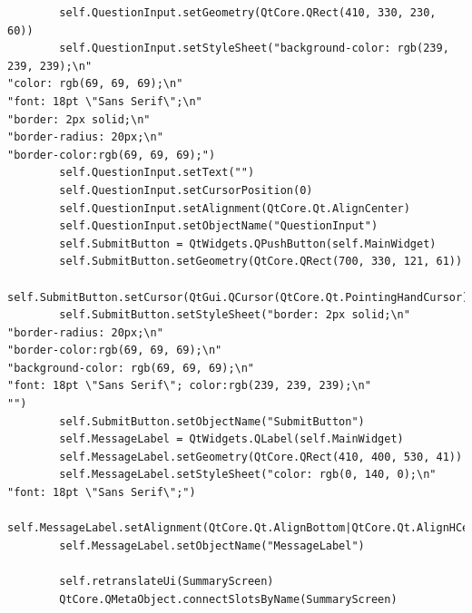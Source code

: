 \documentclass[12pt]{article}
\begin{document}
\begin{lstlisting}
        self.QuestionInput.setGeometry(QtCore.QRect(410, 330, 230, 60))
        self.QuestionInput.setStyleSheet("background-color: rgb(239, 239, 239);\n"
"color: rgb(69, 69, 69);\n"
"font: 18pt \"Sans Serif\";\n"
"border: 2px solid;\n"
"border-radius: 20px;\n"
"border-color:rgb(69, 69, 69);")
        self.QuestionInput.setText("")
        self.QuestionInput.setCursorPosition(0)
        self.QuestionInput.setAlignment(QtCore.Qt.AlignCenter)
        self.QuestionInput.setObjectName("QuestionInput")
        self.SubmitButton = QtWidgets.QPushButton(self.MainWidget)
        self.SubmitButton.setGeometry(QtCore.QRect(700, 330, 121, 61))
        self.SubmitButton.setCursor(QtGui.QCursor(QtCore.Qt.PointingHandCursor))
        self.SubmitButton.setStyleSheet("border: 2px solid;\n"
"border-radius: 20px;\n"
"border-color:rgb(69, 69, 69);\n"
"background-color: rgb(69, 69, 69);\n"
"font: 18pt \"Sans Serif\"; color:rgb(239, 239, 239);\n"
"")
        self.SubmitButton.setObjectName("SubmitButton")
        self.MessageLabel = QtWidgets.QLabel(self.MainWidget)
        self.MessageLabel.setGeometry(QtCore.QRect(410, 400, 530, 41))
        self.MessageLabel.setStyleSheet("color: rgb(0, 140, 0);\n"
"font: 18pt \"Sans Serif\";")
        self.MessageLabel.setAlignment(QtCore.Qt.AlignBottom|QtCore.Qt.AlignHCenter)
        self.MessageLabel.setObjectName("MessageLabel")

        self.retranslateUi(SummaryScreen)
        QtCore.QMetaObject.connectSlotsByName(SummaryScreen)


\end{lstlisting}
\end{document}
